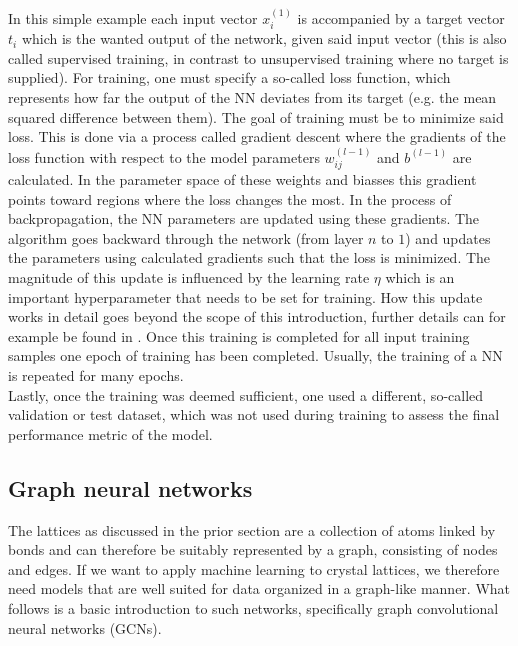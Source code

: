 \documentclass[11pt,a4paper]{article}
\begin{document}
In this simple example each input vector $x^{(1)}_i$ is accompanied by a target vector $t_i$ which is the wanted output of the network, given said input vector (this is also called supervised training, in contrast to unsupervised training where no target is supplied). 
For training, one must specify a so-called loss function, which represents how far the output of the NN deviates from its target (e.g. the mean squared difference between them). 
The goal of training must be to minimize said loss. 
This is done via a process called gradient descent where the gradients of the loss function with respect to the model parameters $w_{ij}^{(l-1)}$ and $ b^{(l-1)}$ are calculated. 
In the parameter space of these weights and biasses this gradient points toward regions where the loss changes the most. 
In the process of backpropagation, the NN parameters are updated using these gradients. 
The algorithm goes backward through the network (from layer $n$ to $1$) and updates the parameters using calculated gradients such that the loss is minimized. 
The magnitude of this update is influenced by the learning rate $\eta$ which is an important hyperparameter that needs to be set for training. 
How this update works in detail goes beyond the scope of this introduction, further details can for example be found in \cite{kubatChapter5Artificial2017}. 
Once this training is completed for all input training samples one epoch of training has been completed. 
Usually, the training of a NN is repeated for many epochs. \\

Lastly, once the training was deemed sufficient, one used a different, so-called validation or test dataset, which was not used during training to assess the final performance metric of the model. 

\subsection{Graph neural networks}
\label{ssec:Graph neural networks}
The lattices as discussed in the prior section are a collection of atoms linked by bonds and can therefore be suitably represented by a graph, consisting of nodes and edges. 
If we want to apply machine learning to crystal lattices, we therefore need models that are well suited for data organized in a graph-like manner. 
What follows is a basic introduction to such networks, specifically graph convolutional neural networks (GCNs). \\
\end{document}
